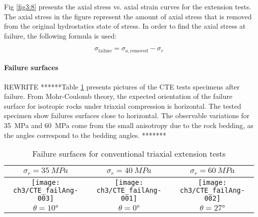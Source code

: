 Fig \ref{fig3:8} presents the axial stress vs. axial strain curves for the extension tests. The axial stress in the figure represent the amount of axial stress that is removed from the original hydrostatics state of stress. In order to find the axial stress at failure, the following formula is used: 

\begin{equation}
    \sigma_\text{failure} = \sigma_{a,\text{removed}} - \sigma_r
\end{equation}

\paragraph{Failure surfaces}

REWRITE ******Table \ref{tb3:photoCTE} presents pictures of the CTE tests specimens after failure. From Mohr-Coulomb theory, the expected orientation of the failure surface for isotropic rocks under triaxial compression is horizontal. The tested specimen show failures surfaces close to horizontal. The observable variations for \SI{35}{MPa} and \SI{60}{MPa} come from the small anisotropy due to the rock bedding, as the angles correspond to the bedding angles. ******* 

\begin{table}
    \centering
    \begin{tabular}{|c|c|c|}
     \hline
     $\sigma_r = \SI{35}{MPa}$ & $\sigma_r = \SI{40}{MPa}$ &  $\sigma_r = \SI{60}{MPa}$ \\
     \hline
     \texttt{[image: ch3/CTE\_failAng-003]} & 
     \texttt{[image: ch3/CTE\_failAng-001]} &
     \texttt{[image: ch3/CTE\_failAng-002]} \\
     \hline
     $\theta = \ang{10}$ & $\theta = \ang{0}$  &  $\theta = \ang{27}$ \\
     \hline
    \end{tabular}
    \caption{Failure surfaces for conventional triaxial extension tests}
    \label{tb3:photoCTE}
\end{table}

